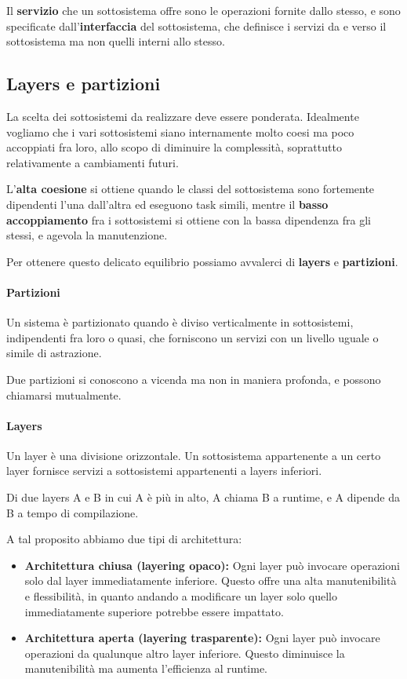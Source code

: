         Il \textbf{servizio} che un sottosistema offre sono le operazioni fornite dallo stesso, e sono specificate dall'\textbf{interfaccia} del sottosistema, che definisce i servizi da e verso il sottosistema ma non quelli interni allo stesso.
        
        \subsection{Layers e partizioni}
            La scelta dei sottosistemi da realizzare deve essere ponderata. Idealmente vogliamo che i vari sottosistemi siano internamente molto coesi ma poco accoppiati fra loro, allo scopo di diminuire la complessità, soprattutto relativamente a cambiamenti futuri.
            
            L'\textbf{alta coesione} si ottiene quando le classi del sottosistema sono fortemente dipendenti l'una dall'altra ed eseguono task simili, mentre il \textbf{basso accoppiamento} fra i sottosistemi si ottiene con la bassa dipendenza fra gli stessi, e agevola la manutenzione.
            
            Per ottenere questo delicato equilibrio possiamo avvalerci di \textbf{layers} e \textbf{partizioni}.
            
            \paragraph{Partizioni} Un sistema è partizionato quando è diviso verticalmente in sottosistemi, indipendenti fra loro o quasi, che forniscono un servizi con un livello uguale o simile di astrazione.
            
            Due partizioni si conoscono a vicenda ma non in maniera profonda, e possono chiamarsi mutualmente.
            
            \paragraph{Layers} Un layer è una divisione orizzontale. Un sottosistema appartenente a un certo layer fornisce servizi a sottosistemi appartenenti a layers inferiori.
            
            Di due layers A e B in cui A è più in alto, A chiama B a runtime, e A dipende da B a tempo di compilazione.
            
            A tal proposito abbiamo due tipi di architettura:
            \begin{itemize}
                \item \textbf{Architettura chiusa (layering opaco):} Ogni layer può invocare operazioni solo dal layer immediatamente inferiore. Questo offre una alta manutenibilità e flessibilità, in quanto andando a modificare un layer solo quello immediatamente superiore potrebbe essere impattato.
                \item \textbf{Architettura aperta (layering trasparente):} Ogni layer può invocare operazioni da qualunque altro layer inferiore. Questo diminuisce la manutenibilità ma aumenta l'efficienza al runtime.
            \end{itemize}
            
